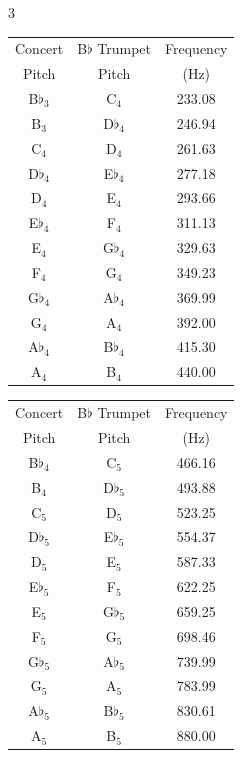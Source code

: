 \documentclass[10pt]{exam}
\begin{document}
\begin{multicols}{3}
  \footnotesize
  \centering

  \begin{tabular}{ccc}
    Concert & B$\flat$ Trumpet & Frequency \\
    Pitch   &  Pitch & (Hz) \\ 
    \hline\hline
    B$\flat_3$ & C$_4$ & 233.08 \\
    B$_3$ & D$\flat_4$ & 246.94 \\
    C$_4$ & D$_4$ & 261.63 \\
    D$\flat_4$ & E$\flat_4$ & 277.18 \\
    D$_4$ & E$_4$ & 293.66 \\
    E$\flat_4$ & F$_4$ & 311.13 \\
    E$_4$ & G$\flat_4$ & 329.63 \\
    F$_4$ & G$_4$ & 349.23 \\
    G$\flat_4$ & A$\flat_4$ & 369.99 \\
    G$_4$ & A$_4$ & 392.00 \\
    A$\flat_4$ & B$\flat_4$ & 415.30 \\
    A$_4$ & B$_4$ & 440.00 \\
    \hline
  \end{tabular}

  \begin{tabular}{ccc}
    Concert & B$\flat$ Trumpet & Frequency \\
    Pitch   &  Pitch & (Hz) \\ 
    \hline\hline
    B$\flat_4$ & C$_5$ & 466.16 \\
    B$_4$ & D$\flat_5$ & 493.88 \\
    C$_5$ & D$_5$ & 523.25 \\
    D$\flat_5$ & E$\flat_5$ & 554.37 \\
    D$_5$ & E$_5$ & 587.33 \\
    E$\flat_5$ & F$_5$ & 622.25 \\
    E$_5$ & G$\flat_5$ & 659.25 \\
    F$_5$ & G$_5$ & 698.46 \\
    G$\flat_5$ & A$\flat_5$ & 739.99 \\
    G$_5$ & A$_5$ & 783.99 \\
    A$\flat_5$ & B$\flat_5$ & 830.61 \\
    A$_5$ & B$_5$ & 880.00 \\
    \hline
  \end{tabular}


\end{multicols}
\end{document}
